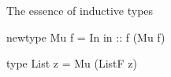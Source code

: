 \documentclass{beamer}
\begin{document}
\begin{frame}[fragile]
\begin{block}{The essence of inductive types}
\begin{center}
    \begin{minipage}{6cm}
      \begin{hcode}
newtype Mu f = In { in :: f (Mu f) }
      \end{hcode}
    \end{minipage}


    \begin{minipage}{5cm}
      \begin{hcode}
type List z = Mu (ListF z)
      \end{hcode}
    \end{minipage}
  \end{center}

\end{block}

\end{frame}




\end{document}
